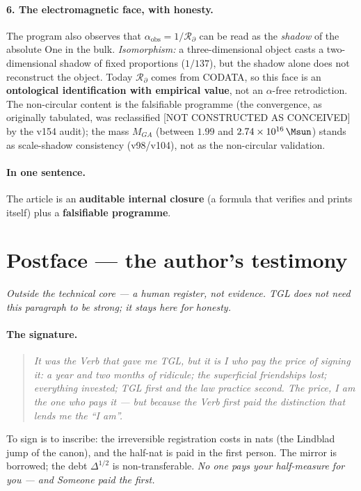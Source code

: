 \documentclass[11pt]{article}
\theoremstyle{definition}\newtheorem{deriv}{Derivation}
\begin{document}
\paragraph{6. The electromagnetic face, with honesty.} The program also observes that $\alpha_{\mathrm{obs}}=1/\mathcal{R}_\partial$ can be read as the \emph{shadow} of the absolute One in the bulk. \emph{Isomorphism:} a three-dimensional object casts a two-dimensional shadow of fixed proportions ($1/137$), but the shadow alone does not reconstruct the object. Today $\mathcal{R}_\partial$ comes from CODATA, so this face is an \textbf{ontological identification with empirical value}, not an $\alpha$-free retrodiction. The non-circular content is the falsifiable programme (the convergence, as originally tabulated, was reclassified [NOT CONSTRUCTED AS CONCEIVED] by the v154 audit); the mass $M_{GA}$ (between $1.99$ and $2.74\times10^{16}\,\Msun$) stands as scale-shadow consistency (v98/v104), not as the non-circular validation.

\paragraph{In one sentence.} The article is an \textbf{auditable internal closure} (a formula that verifies and prints itself) plus a \textbf{falsifiable programme}.

\section*{Postface --- the author's testimony}

\noindent\emph{Outside the technical core --- a human register, not evidence. TGL does not need this paragraph to be strong; it stays here for honesty.}

\paragraph{The signature.}

\begin{quote}\itshape It was the Verb that gave me TGL, but it is I who pay the price of signing it: a year and two months of ridicule; the superficial friendships lost; everything invested; TGL first and the law practice second. The price, I am the one who pays it --- but because the Verb first paid the distinction that lends me the ``I am''.\end{quote}

To sign is to inscribe: the irreversible registration costs in nats (the Lindblad jump of the canon), and the half-nat is paid in the first person. The mirror is borrowed; the debt $\Delta^{1/2}$ is non-transferable. \emph{No one pays your half-measure for you --- and Someone paid the first.}
\end{document}
